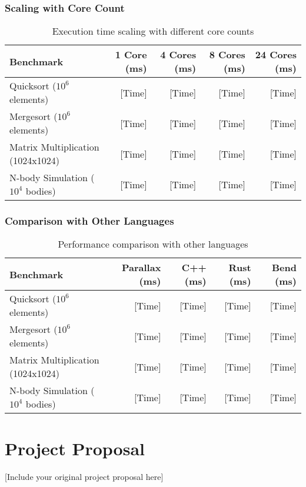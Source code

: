 \documentclass[12pt,a4paper]{report}
\begin{document}
\subsection{Scaling with Core Count}
\begin{table}[h]
    \centering
    \begin{tabular}{lrrrr}
        \toprule
        \textbf{Benchmark} & \textbf{1 Core (ms)} & \textbf{4 Cores (ms)} & \textbf{8 Cores (ms)} & \textbf{24 Cores (ms)} \\
        \midrule
        Quicksort ($10^6$ elements) & [Time] & [Time] & [Time] & [Time] \\
        Mergesort ($10^6$ elements) & [Time] & [Time] & [Time] & [Time] \\
        Matrix Multiplication (1024x1024) & [Time] & [Time] & [Time] & [Time] \\
        N-body Simulation ($10^4$ bodies) & [Time] & [Time] & [Time] & [Time] \\
        \bottomrule
    \end{tabular}
    \caption{Execution time scaling with different core counts}
    \label{tab:core_scaling}
\end{table}

\subsection{Comparison with Other Languages}
\begin{table}[h]
    \centering
    \begin{tabular}{lrrrr}
        \toprule
        \textbf{Benchmark} & \textbf{Parallax (ms)} & \textbf{C++ (ms)} & \textbf{Rust (ms)} & \textbf{Bend (ms)} \\
        \midrule
        Quicksort ($10^6$ elements) & [Time] & [Time] & [Time] & [Time] \\
        Mergesort ($10^6$ elements) & [Time] & [Time] & [Time] & [Time] \\
        Matrix Multiplication (1024x1024) & [Time] & [Time] & [Time] & [Time] \\
        N-body Simulation ($10^4$ bodies) & [Time] & [Time] & [Time] & [Time] \\
        \bottomrule
    \end{tabular}
    \caption{Performance comparison with other languages}
    \label{tab:lang_comparison}
\end{table}

\printindex

\chapter*{Project Proposal}
[Include your original project proposal here]
\end{document}
